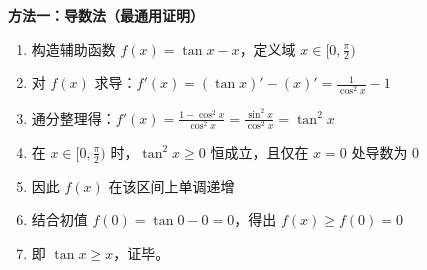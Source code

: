 \begin{proofbox}
\textbf{方法一：导数法（最通用证明）}
\begin{enumerate}
    \item 构造辅助函数 $f(x) = \tan x - x$，定义域 $x \in [0, \frac{\pi}{2})$
    \item 对 $f(x)$ 求导：$f'(x) = (\tan x)' - (x)' = \frac{1}{\cos^2 x} - 1$
    \item 通分整理得：$f'(x) = \frac{1 - \cos^2 x}{\cos^2 x} = \frac{\sin^2 x}{\cos^2 x} = \tan^2 x$
    \item 在 $x \in [0, \frac{\pi}{2})$ 时，$\tan^2 x \geqslant 0$ 恒成立，且仅在 $x=0$ 处导数为 $0$
    \item 因此 $f(x)$ 在该区间上单调递增
    \item 结合初值 $f(0) = \tan 0 - 0 = 0$，得出 $f(x) \geqslant f(0) = 0$
    \item 即 $\tan x \geqslant x$，证毕。
\end{enumerate}
\end{proofbox}